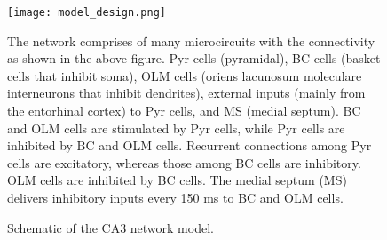 \begin{figure}[htbp]
    \centering
    \texttt{[image: model\_design.png]}
    \caption[Schematic of the CA3 network model]{Schematic of the CA3 network model.}\label{fig:model_design}
    \begin{minipage}{0.9\textwidth}
        The network comprises of many microcircuits with the connectivity as shown in the above figure. Pyr cells (pyramidal), BC cells (basket cells that inhibit soma),
        OLM cells (oriens lacunosum moleculare interneurons that inhibit dendrites), external inputs (mainly from the entorhinal cortex) to Pyr cells, and MS (medial septum).
        BC and OLM cells are stimulated by Pyr cells, while Pyr cells are inhibited by BC and OLM cells.
        Recurrent connections among Pyr cells are excitatory, whereas those among BC cells are inhibitory.
        OLM cells are inhibited by BC cells. The medial septum (MS) delivers inhibitory inputs every 150 ms to BC and OLM cells.
    \end{minipage}
\end{figure}\pagebreak

